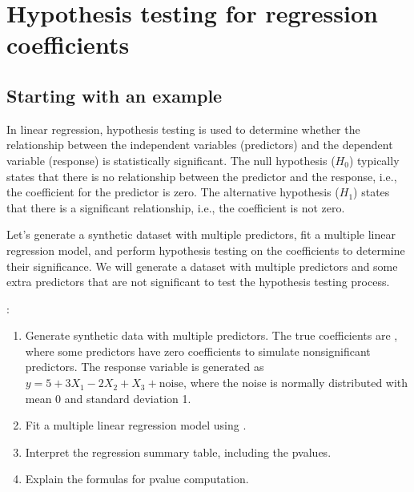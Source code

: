 \documentclass[letterpaper,10pt,english]{jupyterBook}
\begin{document}
\section{Hypothesis testing for regression coefficients}
\label{\detokenize{notebooks/review_linear_models:hypothesis-testing-for-regression-coefficients}}

\subsection{Starting with an example}
\label{\detokenize{notebooks/review_linear_models:starting-with-an-example}}
\sphinxAtStartPar
In linear regression, hypothesis testing is used to determine whether the relationship between the independent variables (predictors) and the dependent variable (response) is statistically significant. The null hypothesis (\(H_0\)) typically states that there is no relationship between the predictor and the response, i.e., the coefficient for the predictor is zero. The alternative hypothesis (\(H_1\)) states that there is a significant relationship, i.e., the coefficient is not zero.

\sphinxAtStartPar
Let’s generate a synthetic dataset with multiple predictors, fit a multiple linear regression model, and perform hypothesis testing on the coefficients to determine their significance. We will generate a dataset with multiple predictors and some extra predictors that are not significant to test the hypothesis testing process.

\sphinxAtStartPar
{}:
\begin{enumerate}
%
\item {} 
\sphinxAtStartPar
Generate synthetic data with multiple predictors. The true coefficients are \sphinxcode{\sphinxupquote{{[}5, 3, \sphinxhyphen{}2, 1, 0, 0{]}}}, where some predictors have zero coefficients to simulate non\sphinxhyphen{}significant predictors. The response variable is generated as \(y = 5 + 3X_1 - 2X_2 + X_3 + \text{noise}\), where the noise is normally distributed with mean 0 and standard deviation 1.

\item {} 
\sphinxAtStartPar
Fit a multiple linear regression model using .

\item {} 
\sphinxAtStartPar
Interpret the regression summary table, including the p\sphinxhyphen{}values.

\item {} 
\sphinxAtStartPar
Explain the formulas for p\sphinxhyphen{}value computation.

\end{enumerate}
\end{document}
